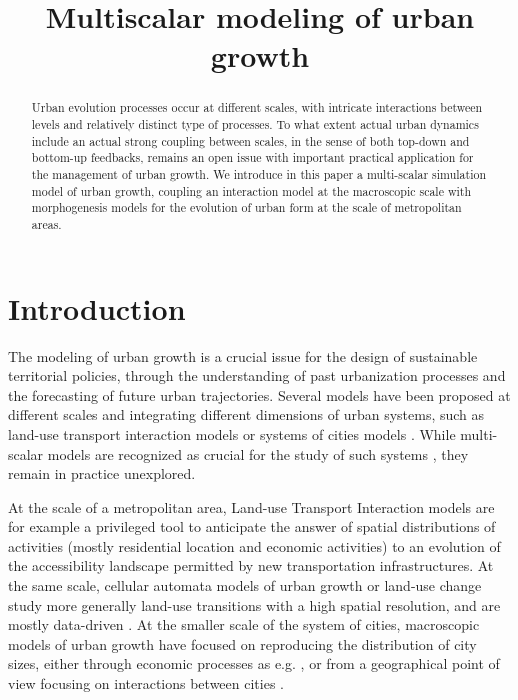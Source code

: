\documentclass[11pt]{article}
\title{Multiscalar modeling of urban growth}
\date{}
\begin{document}
\maketitle


\begin{abstract}
	Urban evolution processes occur at different scales, with intricate interactions between levels and relatively distinct type of processes. To what extent actual urban dynamics include an actual strong coupling between scales, in the sense of both top-down and bottom-up feedbacks, remains an open issue with important practical application for the management of urban growth. We introduce in this paper a multi-scalar simulation model of urban growth, coupling an interaction model at the macroscopic scale with morphogenesis models for the evolution of urban form at the scale of metropolitan areas.
\end{abstract}






\section{Introduction}

The modeling of urban growth is a crucial issue for the design of sustainable territorial policies, through the understanding of past urbanization processes and the forecasting of future urban trajectories. Several models have been proposed at different scales and integrating different dimensions of urban systems, such as land-use transport interaction models \cite{wegener2004land} or systems of cities models \cite{pumain2017urban}. While multi-scalar models are recognized as crucial for the study of such systems \cite{Rozenblat2018}, they remain in practice unexplored.

At the scale of a metropolitan area, Land-use Transport Interaction models \cite{wegener2004land} are for example a privileged tool to anticipate the answer of spatial distributions of activities (mostly residential location and economic activities) to an evolution of the accessibility landscape permitted by new transportation infrastructures. At the same scale, cellular automata models of urban growth or land-use change study more generally land-use transitions with a high spatial resolution, and are mostly data-driven \cite{clarke2007decade}. At the smaller scale of the system of cities, macroscopic models of urban growth have focused on reproducing the distribution of city sizes, either through economic processes as e.g. \cite{gabaix1999zipf}, or from a geographical point of view focusing on interactions between cities \cite{favaro2011gibrat}.
\end{document}
